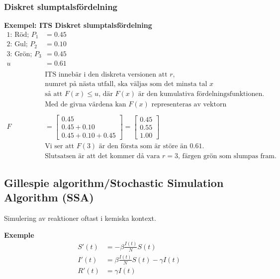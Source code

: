 \documentclass{article}
\begin{document}
\subsubsection{Diskret slumptalsfördelning}

\textbf{Exempel: ITS Diskret slumptalsfördelning}
\begin{align*}
  \text{1: Röd; } P_1 &= 0.45 \\
  \text{2: Gul; } P_2 &= 0.10 \\
  \text{3: Grön; } P_3 &= 0.45 \\
  u&=0.61 \\
  \\
  &\text{ITS innebär i den diskreta versionen att $r$,} \\
  &\text{numret på nästa utfall, ska väljas som det minsta tal $x$} \\
  &\text{så att } F(x)\leq u \text{, där $F(x)$ är den kumulativa fördelningsfunktionen.} \\
  &\text{Med de givna värdena kan $F(x)$ representeras av vektorn} \\
  \\
  F &= 
  \begin{bmatrix}
    0.45 \\
    0.45 + 0.10 \\
    0.45 + 0.10 + 0.45 
  \end{bmatrix} =
  \begin{bmatrix}
    0.45 \\
    0.55 \\
    1.00 
  \end{bmatrix} \\
  &\text{Vi ser att $F(3)$ är den första som är störe än $0.61$.} \\
  &\text{Slutsatsen är att det kommer då vara $r=3$, färgen grön som slumpas fram.}
\end{align*}


\newpage

\subsection{Gillespie algorithm/Stochastic Simulation Algorithm (SSA)}
Simulering av reaktioner oftast i kemiska kontext.

\textbf{Exemple}
\begin{align*}
    S'(t) &= -\beta\frac{I(t)}{N}S(t) \\
    I'(t) &= \beta\frac{I(t)}{N}S(t) -\gamma I(t) \\
    R'(t) &= \gamma I(t) \\
\end{align*}
\end{document}

